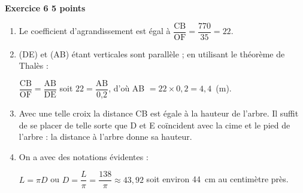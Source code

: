 \textbf{Exercice 6 \hfill 5 points}

\medskip 

%
% 
%
%
%
%

\begin{enumerate}
\item %
Le coefficient d'agrandissement est égal à $\dfrac{\text{CB}}{\text{OF}} =  \dfrac{770}{35} = 22$.
\item %
(DE) et (AB) étant verticales sont parallèle ; en utilisant le théorème de Thalès :

$\dfrac{\text{CB}}{\text{OF}} = \dfrac{\text{AB}}{\text{DE}} $ soit $22 = \dfrac{\text{AB}}{\text{0,2}}$, d'où AB $ = 22 \times 0,2 = 4,4$~(m).
\item %
Avec une telle croix la distance CB est égale à la hauteur de l'arbre. Il suffit de se placer de telle sorte que D et E coïncident avec la cime et le pied de l'arbre : la distance à l'arbre donne sa hauteur. 
\item %

On a avec des notations évidentes : 

$L = \pi D$ ou $D  = \dfrac{L}{\pi} = \dfrac{138}{\pi} \approx43,92$ soit environ 44~cm au centimètre près. 
\end{enumerate} 

\vspace{0,5cm}

